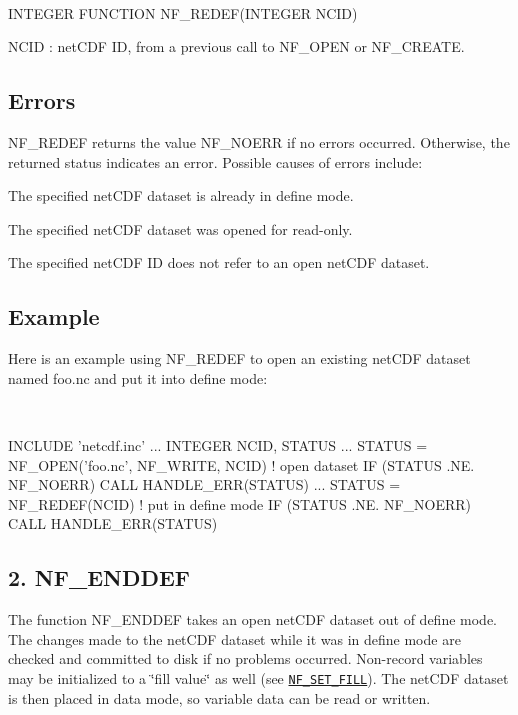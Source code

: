  

I\+N\+T\+E\+G\+ER F\+U\+N\+C\+T\+I\+ON N\+F\+\_\+\+R\+E\+D\+E\+F(\+I\+N\+T\+E\+G\+E\+R N\+C\+I\+D)

{\ttfamily N\+C\+ID} \+: net\+C\+DF ID, from a previous call to N\+F\+\_\+\+O\+P\+EN or N\+F\+\_\+\+C\+R\+E\+A\+TE.

\subsection*{Errors }

N\+F\+\_\+\+R\+E\+D\+EF returns the value N\+F\+\_\+\+N\+O\+E\+RR if no errors occurred. Otherwise, the returned status indicates an error. Possible causes of errors include\+:


\begin{DoxyItemize}
\item The specified net\+C\+DF dataset is already in define mode.
\item The specified net\+C\+DF dataset was opened for read-\/only.
\item The specified net\+C\+DF ID does not refer to an open net\+C\+DF dataset.
\end{DoxyItemize}

\subsection*{Example }

Here is an example using N\+F\+\_\+\+R\+E\+D\+EF to open an existing net\+C\+DF dataset named foo.\+nc and put it into define mode\+:

  
\begin{DoxyCode}
INCLUDE 'netcdf.inc'
   ...
INTEGER NCID, STATUS
   ...
STATUS = NF\_OPEN('foo.nc', NF\_WRITE, NCID)   ! open dataset
IF (STATUS .NE. NF\_NOERR) CALL HANDLE\_ERR(STATUS)
   ...
STATUS = NF\_REDEF(NCID)                      ! put in define mode
IF (STATUS .NE. NF\_NOERR) CALL HANDLE\_ERR(STATUS)
\end{DoxyCode}
\hypertarget{nc_f77_interface_guide_f77_NF-ENDDEF}{}\subsection{2. N\+F\+\_\+\+E\+N\+D\+D\+E\+F }\label{nc_f77_interface_guide_f77_NF-ENDDEF}
The function N\+F\+\_\+\+E\+N\+D\+D\+EF takes an open net\+C\+DF dataset out of define mode. The changes made to the net\+C\+DF dataset while it was in define mode are checked and committed to disk if no problems occurred. Non-\/record variables may be initialized to a \char`\"{}fill value\char`\"{} as well (see \href{#NF_005fSET_005fFILL}{\tt N\+F\+\_\+\+S\+E\+T\+\_\+\+F\+I\+LL}). The net\+C\+DF dataset is then placed in data mode, so variable data can be read or written.

